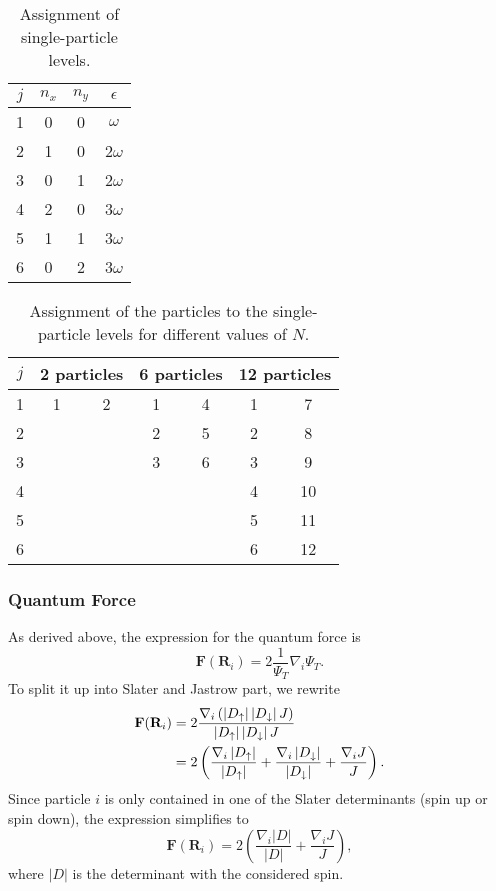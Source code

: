 \begin{table}
      \begin{center}
         \begin{tabular}{c| c c c}
		\hline $j$ & $n_x$ & $n_y$ & $\epsilon$ \\
		\hline 1 & 0 & 0 & $\omega$\\
		2 & 1 & 0 &2$\omega$\\
		3 & 0 &1 &2$\omega$\\
		4 &2 &0 &3$\omega$\\
		5 & 1&1 &3$\omega$\\
		6 & 0&2 &3$\omega$ \\
		\hline
		\end{tabular}
		\end{center}
      \caption{Assignment of single-particle levels.}
      \label{tab:sub1}
\end{table}   

\begin{table}
	\begin{center}
      \begin{tabular}{|c| c c |c c |c c| }
		\hline 
		$j$ & \multicolumn{2}{c|}{ 2 particles} & \multicolumn{2}{c|}{6 particles} & \multicolumn{2}{c|}{12 particles}\\ \hline
		 1 &1 & 2& 1& 4& 1 & 7 \\
		  2 & & & 2&5 & 2 & 8 \\
		   3 & & &3 &6 & 3 & 9 \\
		   4 & & & & & 4 & 10 \\ 
		   5 & & & & & 5 & 11 \\ 
		   6 & & & & & 6 & 12 \\  	   
		\hline
		\end{tabular}
\end{center}
\caption{Assignment of the particles to the single-particle levels for different values of $N$.}
\label{tab:allpartcodes}
\end{table}

\subsubsection{Quantum Force}
As derived above, the expression for the quantum force is
\[
\mathbf{F}(\mathbf{R}_i) = 2 \frac{1}{\Psi_T}\nabla_i \Psi_T.
\]
To split it up into Slater and Jastrow part, we rewrite
\begin{align*}
\mathbf{F}(\mathbf{R}_i) &= 2  \frac{\nabla_i \left( \left|D_{\uparrow}\right| \left|D_{\downarrow}\right| J \right)}{\left|D_{\uparrow}\right| \left|D_{\downarrow}\right| J}\\
&= 2 \left(\frac{\nabla_i \left|D_{\uparrow}\right|}{\left|D_{\uparrow}\right|} + \frac{\nabla_i \left|D_{\downarrow}\right|}{\left|D_{\downarrow}\right|} + \frac{\nabla_i J}{J}\right).
\end{align*}
Since particle $i$ is only contained in one of the Slater determinants (spin up or spin down), the expression simplifies to
\[
\mathbf{F}(\mathbf{R}_i) = 2 \left(\frac{\nabla_i |D|}{|D|} + \frac{\nabla_i J}{J}\right),
\]
where $|D|$  is the determinant with the considered spin.

